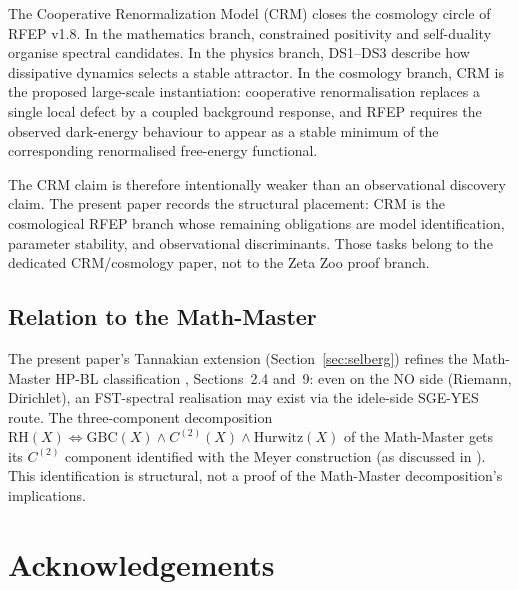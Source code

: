 \documentclass[11pt,a4paper]{article}
\theoremstyle{plain}
\theoremstyle{definition}
\begin{document}
The Cooperative Renormalization Model (CRM) closes the cosmology
circle of RFEP v1.8.  In the mathematics branch, constrained
positivity and self-duality organise spectral candidates.  In the
physics branch, DS1--DS3 describe how dissipative dynamics selects a
stable attractor.  In the cosmology branch, CRM is the proposed
large-scale instantiation: cooperative renormalisation replaces a
single local defect by a coupled background response, and RFEP
requires the observed dark-energy behaviour to appear as a stable
minimum of the corresponding renormalised free-energy functional.

The CRM claim is therefore intentionally weaker than an observational
discovery claim.  The present paper records the structural placement:
CRM is the cosmological RFEP branch whose remaining obligations are
model identification, parameter stability, and observational
discriminants.  Those tasks belong to the dedicated CRM/cosmology
paper, not to the Zeta Zoo proof branch.

\subsection{Relation to the Math-Master}

The present paper's Tannakian extension (Section~\ref{sec:selberg})
refines the Math-Master HP-BL classification
\cite{MathMaster}, Sections~2.4 and~9: even on the NO side (Riemann,
Dirichlet), an FST-spectral realisation may exist via the
idele-side SGE-YES route.  The three-component decomposition
$\mathrm{RH}(X) \iff \mathrm{GBC}(X) \wedge C^{(2)}(X) \wedge
\mathrm{Hurwitz}(X)$ of the Math-Master gets its $C^{(2)}$
component identified with the Meyer construction (as discussed in
\cite{C2LayerStatus}).  This identification is structural, not a
proof of the Math-Master decomposition's implications.

\section*{Acknowledgements}
\end{document}
